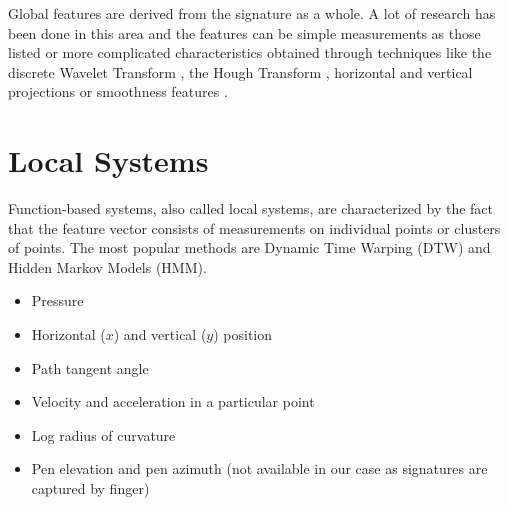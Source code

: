 \documentclass[a4paper, oneside]{csthesis}
\begin{document}
Global features are derived from the signature as a whole. A lot of research has been done in this area and the features can be simple measurements as those listed or more complicated characteristics obtained through techniques like the discrete Wavelet Transform \cite{ji2005signature}, the Hough Transform \cite{kaewkongka1999off}, horizontal and vertical projections \cite{fang2003off} or smoothness features \cite{fang2001offline}.







\section{Local Systems}
\label{sec:functions}



Function-based systems, also called local systems, are characterized by the fact that the feature vector consists of measurements on individual points or clusters of points.
The most popular methods are Dynamic Time Warping (DTW) and Hidden Markov Models (HMM).

\begin{itemize}
\item Pressure
\item Horizontal ($x$) and vertical ($y$) position
\item Path tangent angle
\item Velocity and acceleration in a particular point
\item Log radius of curvature
\item Pen elevation and pen azimuth (not available in our case as signatures are captured by finger)
\end{itemize}
\end{document}
